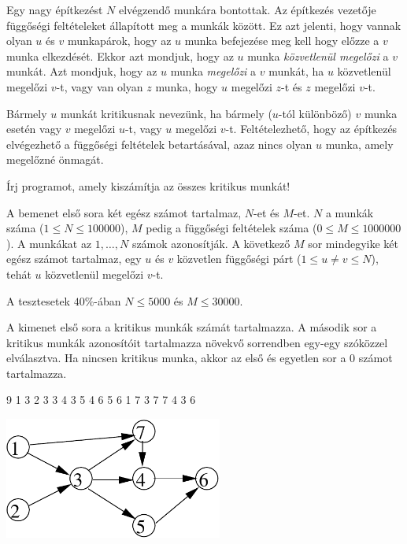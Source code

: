





Egy nagy építkezést $N$ elvégzendő munkára bontottak. Az építkezés vezetője függőségi feltételeket állapított meg a munkák között. Ez azt jelenti, hogy vannak olyan $u$ és $v$ munkapárok, hogy az $u$ munka befejezése meg kell hogy előzze a $v$ munka elkezdését. Ekkor azt mondjuk, hogy az $u$ munka \emph{közvetlenül megelőzi} a $v$ munkát. Azt mondjuk, hogy az $u$ munka \emph{megelőzi} a $v$ munkát, ha $u$ közvetlenül megelőzi $v$-t, vagy van olyan $z$ munka, hogy $u$ megelőzi $z$-t és $z$ megelőzi $v$-t.

Bármely $u$ munkát kritikusnak nevezünk, ha bármely ($u$-tól különböző) $v$ munka esetén vagy $v$ megelőzi $u$-t, vagy $u$ megelőzi $v$-t. Feltételezhető, hogy az építkezés elvégezhető a függőségi feltételek betartásával, azaz nincs olyan $u$ munka, amely megelőzné önmagát.


Írj programot, amely kiszámítja az összes kritikus munkát!


A bemenet első sora két egész számot tartalmaz, $N$-et és $M$-et. $N$ a munkák száma ($1 \leq N \leq 100000$), $M$ pedig a függőségi feltételek száma ($0 \leq M \leq 1000000$). A munkákat az $1, \ldots ,N$ számok azonosítják. A következő $M$ sor mindegyike két egész számot tartalmaz, egy $u$ és $v$ közvetlen függőségi párt ($1 \leq u \neq v \leq N$), tehát $u$ közvetlenül megelőzi $v$-t.


A tesztesetek $40 \%$-ában $N \leq 5000$ és $M \leq 30000$.



A kimenet első sora a kritikus munkák számát tartalmazza. A második sor a kritikus munkák azonosítóit tartalmazza növekvő sorrendben egy-egy szóközzel elválasztva. Ha nincsen kritikus munka, akkor az első és egyetlen sor a 0 számot tartalmazza.



 9
1 3
2 3
3 4
3 5
4 6
5 6
1 7
3 7
7 4
3 6
\sampleCOMMENT

\sampleEND

\includegraphics[height=4cm]{img/critical-fig.pdf}


